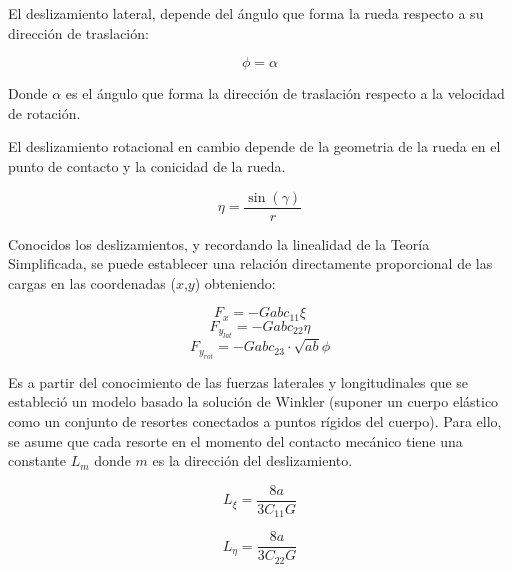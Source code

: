 \documentclass[main]{subfiles}
\begin{document}
El deslizamiento lateral, depende del ángulo que forma  la rueda respecto a su dirección de traslación:

\begin{equation}
\phi=\alpha
\end{equation}

\par \hspace{1cm}
\begin{minipage}{10cm}
\begin{spacing}{0.5}
Donde $\alpha$ es el ángulo que forma la dirección de traslación respecto a la velocidad de rotación.
\end{spacing}
\end{minipage}

El deslizamiento rotacional en cambio depende de la geometria de la rueda en el punto de contacto y la conicidad de la rueda.

\begin{equation}
\eta=\frac{\sin(\gamma)}{r}
\end{equation}

Conocidos los deslizamientos, y recordando la linealidad de la Teoría Simplificada, se puede establecer una relación directamente proporcional de las cargas en las coordenadas ($x$,$y$) obteniendo:

\begin{equation}
\label{eq:Kalkerlong}
F_x=-Gabc_{11}\xi
\end{equation}
\begin{equation}
\label{eq:Kalkerlat}
F_{y_{lat}}=-Gabc_{22}\eta
\end{equation}
\begin{equation}
\label{eq:Kalkerrot}
F_{y_{rot}}=-Gabc_{23} \cdot \sqrt{ab} \phi
\end{equation}

Es a partir del conocimiento de las fuerzas laterales y longitudinales que se estableció un modelo basado la solución de Winkler (suponer un cuerpo elástico como un conjunto de resortes conectados a puntos rígidos del cuerpo).  Para ello, se asume que cada resorte en el momento del contacto mecánico tiene una constante $L_m$ donde $m$ es la dirección del deslizamiento.

\begin{equation}
\label{eq:L1}
L_\xi=\frac{8a}{3C_{11}G}
\end{equation}

\begin{equation}
\label{eq:L2}
L_\eta=\frac{8a}{3C_{22}G}
\end{equation}
\end{document}
